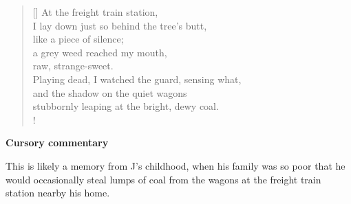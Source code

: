 \documentclass[a4paper,12pt,twoside,final]{book}
\begin{document}
\begin{verse}[\versewidth]
  At the freight train station, \\
  I lay down just so behind the tree's butt, \\
  like a piece of silence; \\
  a grey weed reached my mouth, \\
  raw, strange-sweet. \\
  Playing dead, I watched the guard, sensing what, \\
  and the shadow on the quiet wagons \\
  stubbornly leaping at the bright, dewy coal. \\!
\end{verse}


\bigskip

\noindent \textbf{Cursory commentary}

\medskip

This is likely a memory from J's childhood, when his family was so
poor that he would occasionally steal lumps of coal from the wagons at
the freight train station nearby his home.

\newpage

\settowidth{\versewidth}{Csak ami nincs, annak van bokra,}
\end{document}
